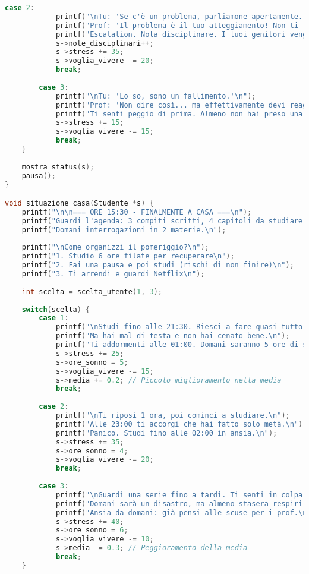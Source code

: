 \documentclass[a4paper,12pt]{article}
\begin{document}
\begin{lstlisting}[language=C, caption=Codice completo (file Capolavoro2.c)]
        case 2:
            printf("\nTu: 'Se c'è un problema, parliamone apertamente.'\n");
            printf("Prof: 'Il problema è il tuo atteggiamento! Non ti rendi conto della gravità!'\n");
            printf("Escalation. Nota disciplinare. I tuoi genitori vengono avvisati.\n");
            s->note_disciplinari++;
            s->stress += 35;
            s->voglia_vivere -= 20;
            break;
            
        case 3:
            printf("\nTu: 'Lo so, sono un fallimento.'\n");
            printf("Prof: 'Non dire così... ma effettivamente devi reagire.'\n");
            printf("Ti senti peggio di prima. Almeno non hai preso una nota.\n");
            s->stress += 15;
            s->voglia_vivere -= 15;
            break;
    }
    
    mostra_status(s);
    pausa();
}

void situazione_casa(Studente *s) {
    printf("\n\n=== ORE 15:30 - FINALMENTE A CASA ===\n");
    printf("Guardi l'agenda: 3 compiti scritti, 4 capitoli da studiare, ricerca di gruppo.\n");
    printf("Domani interrogazioni in 2 materie.\n");
    
    printf("\nCome organizzi il pomeriggio?\n");
    printf("1. Studio 6 ore filate per recuperare\n");
    printf("2. Fai una pausa e poi studi (rischi di non finire)\n");
    printf("3. Ti arrendi e guardi Netflix\n");
    
    int scelta = scelta_utente(1, 3);
    
    switch(scelta) {
        case 1:
            printf("\nStudi fino alle 21:30. Riesci a fare quasi tutto.\n");
            printf("Ma hai mal di testa e non hai cenato bene.\n");
            printf("Ti addormenti alle 01:00. Domani saranno 5 ore di sonno.\n");
            s->stress += 25;
            s->ore_sonno = 5;
            s->voglia_vivere -= 15;
            s->media += 0.2; // Piccolo miglioramento nella media
            break;
            
        case 2:
            printf("\nTi riposi 1 ora, poi cominci a studiare.\n");
            printf("Alle 23:00 ti accorgi che hai fatto solo metà.\n");
            printf("Panico. Studi fino alle 02:00 in ansia.\n");
            s->stress += 35;
            s->ore_sonno = 4;
            s->voglia_vivere -= 20;
            break;
            
        case 3:
            printf("\nGuardi una serie fino a tardi. Ti senti in colpa.\n");
            printf("Domani sarà un disastro, ma almeno stasera respiri.\n");
            printf("Ansia da domani: già pensi alle scuse per i prof.\n");
            s->stress += 40;
            s->ore_sonno = 6;
            s->voglia_vivere -= 10;
            s->media -= 0.3; // Peggioramento della media
            break;
    }
    

\end{lstlisting}
\end{document}
